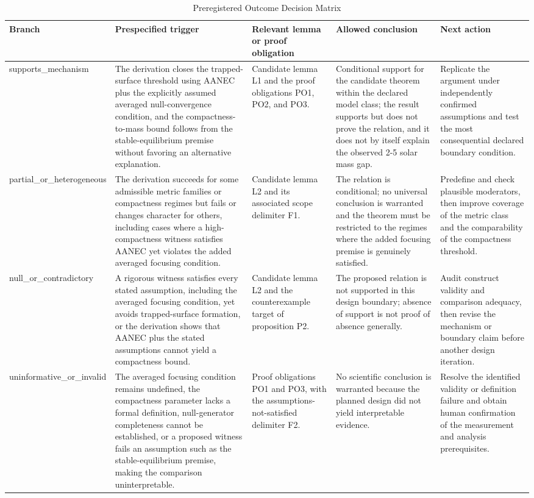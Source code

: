 \documentclass[conference]{IEEEtran}
\begin{document}
\begin{table}[htbp]
\centering
\footnotesize
\setlength{\tabcolsep}{3pt}
\renewcommand{\arraystretch}{1.12}
\caption{Preregistered Outcome Decision Matrix}
\label{tab:expected-outcomes-eoc-decision-matrix}
\begin{tabular}{|p{}|p{}|p{}|p{}|p{}|}
\hline
Branch & Prespecified trigger & Relevant lemma or proof obligation & Allowed conclusion & Next action \\\hline
supports\_mechanism & The derivation closes the trapped-surface threshold using AANEC plus the explicitly assumed averaged null-convergence condition, and the compactness-to-mass bound follows from the stable-equilibrium premise without favoring an alternative explanation. & Candidate lemma L1 and the proof obligations PO1, PO2, and PO3. & Conditional support for the candidate theorem within the declared model class; the result supports but does not prove the relation, and it does not by itself explain the observed 2-5 solar mass gap. & Replicate the argument under independently confirmed assumptions and test the most consequential declared boundary condition. \\\hline
partial\_or\_heterogeneous & The derivation succeeds for some admissible metric families or compactness regimes but fails or changes character for others, including cases where a high-compactness witness satisfies AANEC yet violates the added averaged focusing condition. & Candidate lemma L2 and its associated scope delimiter F1. & The relation is conditional; no universal conclusion is warranted and the theorem must be restricted to the regimes where the added focusing premise is genuinely satisfied. & Predefine and check plausible moderators, then improve coverage of the metric class and the comparability of the compactness threshold. \\\hline
null\_or\_contradictory & A rigorous witness satisfies every stated assumption, including the averaged focusing condition, yet avoids trapped-surface formation, or the derivation shows that AANEC plus the stated assumptions cannot yield a compactness bound. & Candidate lemma L2 and the counterexample target of proposition P2. & The proposed relation is not supported in this design boundary; absence of support is not proof of absence generally. & Audit construct validity and comparison adequacy, then revise the mechanism or boundary claim before another design iteration. \\\hline
uninformative\_or\_invalid & The averaged focusing condition remains undefined, the compactness parameter lacks a formal definition, null-generator completeness cannot be established, or a proposed witness fails an assumption such as the stable-equilibrium premise, making the comparison uninterpretable. & Proof obligations PO1 and PO3, with the assumptions-not-satisfied delimiter F2. & No scientific conclusion is warranted because the planned design did not yield interpretable evidence. & Resolve the identified validity or definition failure and obtain human confirmation of the measurement and analysis prerequisites. \\\hline

\end{tabular}
\end{table}
\end{document}
